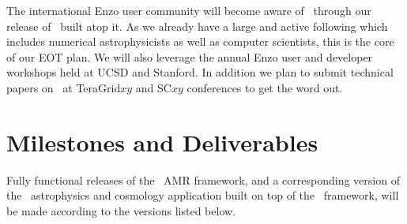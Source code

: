 \documentclass[11pt,letterpaper]{article}
\begin{document}
 The international 
Enzo user community will become aware of \cello\ through our release
of \enzoii\ built atop it. As we already have a large and active following
which includes numerical astrophysicists as well as computer scientists,
this is the core of our EOT plan. We will also leverage the annual
Enzo user and developer workshops held at UCSD and Stanford. In addition we
plan to submit technical papers on \cello\ at TeraGrid$xy$ and SC$xy$ conferences
to get the word out. 

\section{Milestones and Deliverables} \label{s:milestones}

Fully functional releases of the \cello\ AMR framework, and a
corresponding version of the \enzoii\ astrophysics and cosmology
application built on top of the \cello\ framework, will be made
according to the versions listed below.

   
\end{document}
